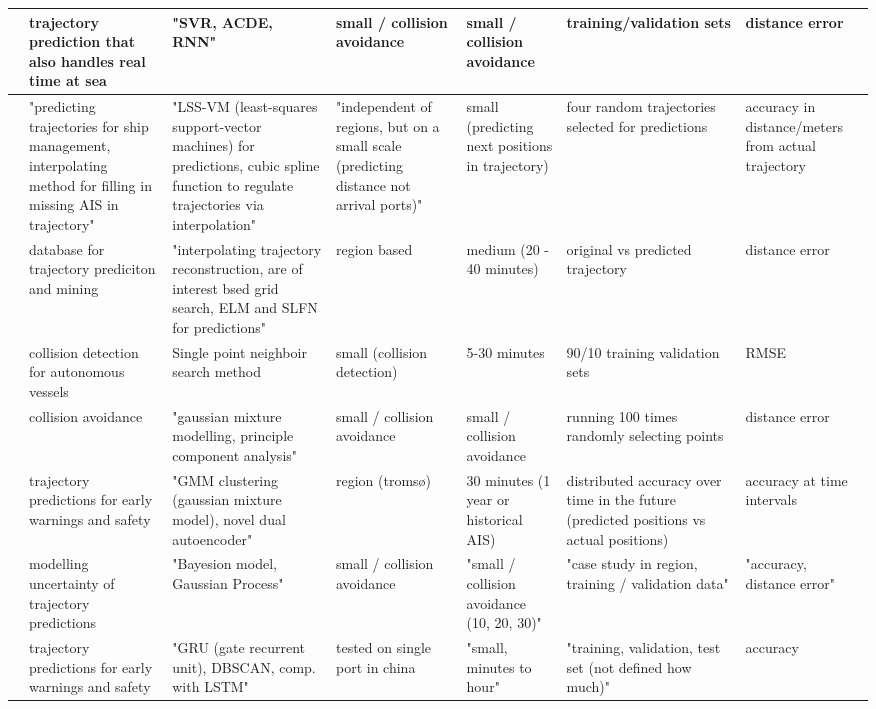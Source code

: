 \begin{sidewaystable}
{\begin{tabular}{|l|l|l|l|l|l|l|}
        \cite{Liu2019VesselACDE-SVR} & trajectory prediction that also handles real time at sea & "SVR, ACDE, RNN" & small / collision avoidance & small / collision avoidance & training/validation sets & distance error \\ \hline
        \cite{Liu2020PredictingLearning} & "predicting trajectories for ship management, interpolating method for filling in missing AIS in trajectory" & "LSS-VM (least-squares support-vector machines) for predictions, cubic spline function to regulate trajectories via interpolation" & "independent of regions, but on a small scale (predicting distance not arrival ports)" & small (predicting next positions in trajectory) & four random trajectories selected for predictions & accuracy in distance/meters from actual trajectory \\ \hline
        \cite{Mao2018AnMining} & database for trajectory prediciton and mining & "interpolating trajectory reconstruction, are of interest bsed grid search, ELM and SLFN for predictions" & region based & medium (20 - 40 minutes) & original vs predicted trajectory & distance error \\ \hline
        \cite{Murray2018AOperations} & collision detection for autonomous vessels & Single point neighboir search method & small (collision detection) & 5-30 minutes & 90/10 training validation sets & RMSE \\ \hline
        \cite{Murray2019AnVessels} & collision avoidance & "gaussian mixture modelling, principle component analysis" & small / collision avoidance & small / collision avoidance & running 100 times randomly selecting points & distance error \\ \hline
        \cite{Murray2020AData} & trajectory predictions for early warnings and safety & "GMM clustering (gaussian mixture model), novel dual autoencoder" & region (tromsø) & 30 minutes (1 year or historical AIS) & distributed accuracy over time in the future (predicted positions vs actual positions) & accuracy at time intervals \\ \hline
        \cite{Rong2019ShipModel} & modelling uncertainty of trajectory predictions & "Bayesion model, Gaussian Process" & small / collision avoidance & "small / collision avoidance (10, 20, 30)" & "case study in region, training / validation data" & "accuracy, distance error" \\ \hline
        \cite{Suo2020ANetwork} & trajectory predictions for early warnings and safety & "GRU (gate recurrent unit), DBSCAN, comp. with LSTM" & tested on single port in china & "small, minutes to hour" & "training, validation, test set (not defined how much)" & accuracy \\ \hline

\end{tabular}}
\end{sidewaystable}

